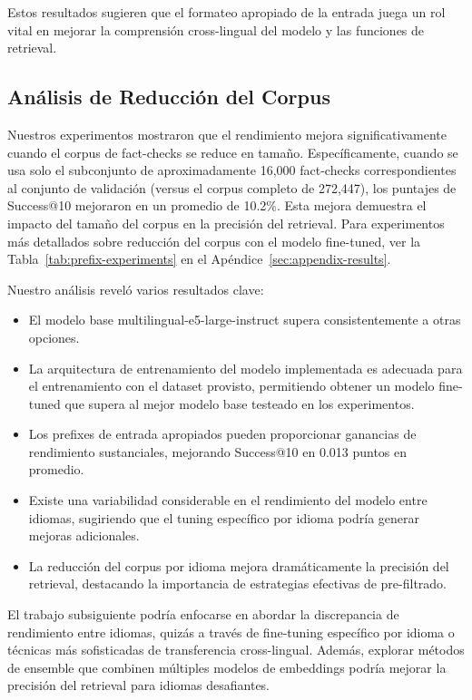 \documentclass[11pt]{article}
\begin{document}
Estos resultados sugieren que el formateo apropiado de la entrada juega un rol vital en mejorar la comprensión cross-lingual del modelo y las funciones de retrieval.

\subsection{Análisis de Reducción del Corpus}
Nuestros experimentos mostraron que el rendimiento mejora significativamente cuando el corpus de fact-checks se reduce en tamaño. Específicamente, cuando se usa solo el subconjunto de aproximadamente 16,000 fact-checks correspondientes al conjunto de validación (versus el corpus completo de 272,447), los puntajes de Success@10 mejoraron en un promedio de 10.2\%. Esta mejora demuestra el impacto del tamaño del corpus en la precisión del retrieval. Para experimentos más detallados sobre reducción del corpus con el modelo fine-tuned, ver la Tabla~\ref{tab:prefix-experiments} en el Apéndice~\ref{sec:appendix-results}.

Nuestro análisis reveló varios resultados clave:

\begin{itemize}
    \item El modelo base multilingual-e5-large-instruct supera consistentemente a otras opciones.
    \item La arquitectura de entrenamiento del modelo implementada es adecuada para el entrenamiento con el dataset provisto, permitiendo obtener un modelo fine-tuned que supera al mejor modelo base testeado en los experimentos.
    \item Los prefixes de entrada apropiados pueden proporcionar ganancias de rendimiento sustanciales, mejorando Success@10 en 0.013 puntos en promedio.
    \item Existe una variabilidad considerable en el rendimiento del modelo entre idiomas, sugiriendo que el tuning específico por idioma podría generar mejoras adicionales.
    \item La reducción del corpus por idioma mejora dramáticamente la precisión del retrieval, destacando la importancia de estrategias efectivas de pre-filtrado.
\end{itemize}

El trabajo subsiguiente podría enfocarse en abordar la discrepancia de rendimiento entre idiomas, quizás a través de fine-tuning específico por idioma o técnicas más sofisticadas de transferencia cross-lingual. Además, explorar métodos de ensemble que combinen múltiples modelos de embeddings podría mejorar la precisión del retrieval para idiomas desafiantes.
\end{document}
